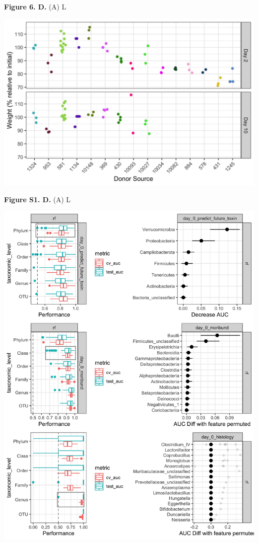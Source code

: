 \documentclass[
  12pt,
]{article}
\begin{document}
\textbf{Figure 6. D.} (A) L

\hfill\break

\includegraphics{../results/figures/figure_S1.jpg}

\textbf{Figure S1. D.} (A) L

\hfill\break

\includegraphics{../results/figures/figure_S2.jpg}
\end{document}
